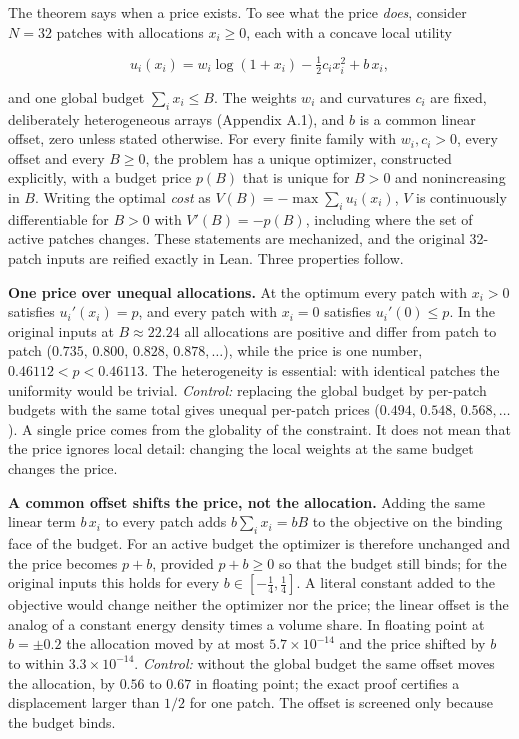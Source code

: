 The theorem says when a price exists. To see what the price \emph{does},
consider \(N=32\) patches with allocations \(x_i\ge 0\), each with a
concave local utility

\[u_i(x_i)=w_i\log(1+x_i)-\tfrac12 c_i x_i^2+b\,x_i,\]

and one global budget \(\sum_i x_i\le B\). The weights \(w_i\) and
curvatures \(c_i\) are fixed, deliberately heterogeneous arrays
(Appendix A.1), and \(b\) is a common linear offset, zero unless stated
otherwise. For every finite family with \(w_i,c_i>0\), every offset and
every \(B\ge0\), the problem has a unique optimizer, constructed
explicitly, with a budget price \(p(B)\) that is unique for \(B>0\) and
nonincreasing in \(B\). Writing the optimal \emph{cost} as
\(V(B)=-\max\sum_iu_i(x_i)\), \(V\) is continuously differentiable for
\(B>0\) with \(V'(B)=-p(B)\), including where the set of active patches
changes. These statements are mechanized, and the original 32-patch
inputs are reified exactly in Lean. Three properties follow.

\textbf{One price over unequal allocations.} At the optimum every patch
with \(x_i>0\) satisfies \(u_i'(x_i)=p\), and every patch with \(x_i=0\)
satisfies \(u_i'(0)\le p\). In the original inputs at \(B\approx22.24\)
all allocations are positive and differ from patch to patch
(\(0.735,\,0.800,\,0.828,\,0.878,\ldots\)), while the price is one
number, \(0.46112<p<0.46113\). The heterogeneity is essential: with
identical patches the uniformity would be trivial. \emph{Control:}
replacing the global budget by per-patch budgets with the same total
gives unequal per-patch prices (\(0.494,\,0.548,\,0.568,\ldots\)). A
single price comes from the globality of the constraint. It does not
mean that the price ignores local detail: changing the local weights at
the same budget changes the price.

\textbf{A common offset shifts the price, not the allocation.} Adding
the same linear term \(b\,x_i\) to every patch adds \(b\sum_i x_i=bB\)
to the objective on the binding face of the budget. For an active budget
the optimizer is therefore unchanged and the price becomes \(p+b\),
provided \(p+b\ge0\) so that the budget still binds; for the original
inputs this holds for every \(b\in[-\tfrac14,\tfrac14]\). A literal
constant added to the objective would change neither the optimizer nor
the price; the linear offset is the analog of a constant energy density
times a volume share. In floating point at \(b=\pm0.2\) the allocation
moved by at most \(5.7\times10^{-14}\) and the price shifted by \(b\) to
within \(3.3\times10^{-14}\). \emph{Control:} without the global budget
the same offset moves the allocation, by \(0.56\) to \(0.67\) in
floating point; the exact proof certifies a displacement larger than
\(1/2\) for one patch. The offset is screened only because the budget
binds.

